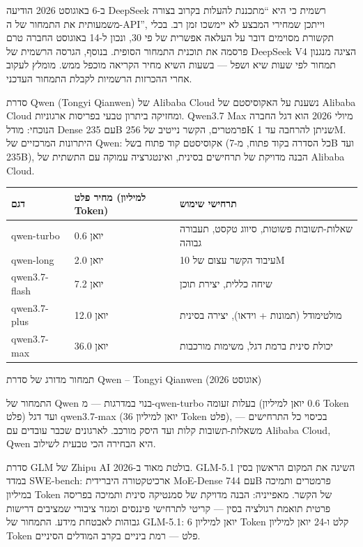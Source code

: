 ב-6 באוגוסט 2026 הודיעה DeepSeek רשמית כי היא “מתכננת להעלות בקרוב בצורה משמעותית את התמחור של ה-API”, וייתכן שמחירי המבצע לא יימשכו זמן רב. בכלי תקשורת מסוימים דובר על העלאה אפשרית של פי 30, ונכון ל-14 באוגוסט החברה טרם פרסמה את תוכנית התמחור הסופית. בנוסף, הגרסה הרשמית של DeepSeek V4 הציגה מנגנון תמחור לפי שעות שיא ושפל — בשעות השיא מחיר הקריאה מוכפל ממש. מומלץ לעקוב אחרי ההכרזות הרשמיות לקבלת התמחור העדכני.


סדרת Qwen (Tongyi Qianwen) של Alibaba Cloud נשענת על האקוסיסטם של Alibaba Cloud ומחזיקה ביתרון טבעי בפריסות ארגוניות. Qwen3.7 Max מיולי 2026 הוא דגל החברה הנוכחי: מודל Dense עם 235B פרמטרים, הקשר נייטיב של 256K שניתן להרחבה עד 1M. היתרונות המרכזיים של Qwen: אקוסיסטם קוד פתוח בשל (כל הסדרה בקוד פתוח, מ-7B ועד 235B), הבנה מדויקת של תרחישים בסינית, ואינטגרציה עמוקה עם התשתית של Alibaba Cloud.

\begin{center}
\begin{tabularx}{\linewidth}{|X|X|X|}
\hline
\textbf{דגם} & \textbf{מחיר פלט (למיליון Token)} & \textbf{תרחישי שימוש} \tabularnewline
\hline
qwen-turbo & 0.6 יואן & שאלות-תשובות פשוטות, סיווג טקסט, תעבורה גבוהה \tabularnewline
qwen-long & 2.0 יואן & עיבוד הקשר עצום של 10M \tabularnewline
qwen3.7-flash & 7.2 יואן & שיחה כללית, יצירת תוכן \tabularnewline
qwen3.7-plus & 12.0 יואן & מולטימודל (תמונות + וידאו), יצירה בסינית \tabularnewline
qwen3.7-max & 36.0 יואן & יכולת סינית ברמת דגל, משימות מורכבות \tabularnewline
\hline
\end{tabularx}
\end{center}

\begin{center}\small\color{gray}תמחור מדורג של סדרת Qwen – Tongyi Qianwen (אוגוסט 2026)\end{center}

התמחור של Qwen בנוי במדרגות — מ-qwen-turbo בעלות זעומה (0.6 יואן למיליון Token פלט) ועד דגל qwen3.7-max (36 יואן למיליון Token פלט), בכיסוי כל התרחישים — משאלות-תשובות קלות ועד היסק מורכב. לארגונים שכבר עובדים עם Alibaba Cloud, Qwen היא הבחירה הכי טבעית לשילוב.


סדרת GLM של Zhipu AI בולטת מאוד ב-2026. GLM-5.1 השיגה את המקום הראשון בסין במדד SWE-bench: ארכיטקטורה היברידית MoE-Dense עם 744B פרמטרים ותמיכה במיליון Token של הקשר. מאפייניה: הבנה מדויקת של סמנטיקה סינית ותמיכה בפריסה פרטית תואמת רגולציה בסין — קריטי לתרחישי פיננסים ומגזר ציבורי שמציבים דרישות גבוהות לאבטחת מידע. התמחור של GLM-5.1: 6 יואן למיליון Token קלט ו-24 יואן למיליון Token פלט — רמת ביניים בקרב המודלים הסיניים.

